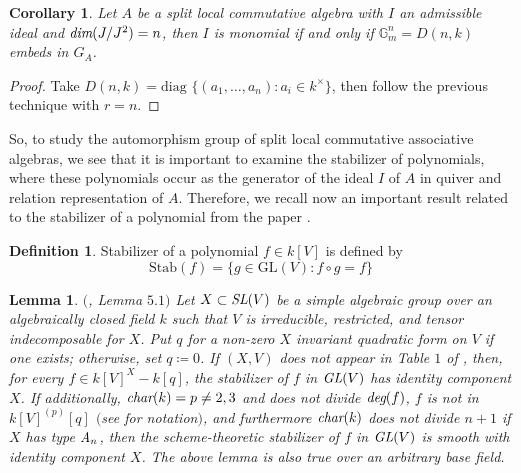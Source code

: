 \documentclass[12pt]{amsart}
\newtheorem{lemma}[theorem]{Lemma}
\newtheorem{corollary}[theorem]{Corollary}
\theoremstyle{definition}
\newtheorem{definition}[theorem]{Definition}
\numberwithin{equation}{section}
\begin{document}
\begin{corollary}\label{Corollary 5.27}
Let $A$ be a split local commutative algebra with $I$ an admissible ideal and $\emph{dim}(J/J^2)=n$, then $I$ is monomial if and only if $\mathbb{G}_m^n=D(n,k)$ embeds in $G_A$. 
\end{corollary} 
\vskip1mm
\begin{proof}
    Take $D(n,k)=\text{diag }\{(a_1,\dots,a_n): a_i\in k^{\times}\}$, then follow the previous technique with $r=n$.
\end{proof}
\vspace{0.1in}
\noindent
So, to study the automorphism group of split local commutative associative algebras, we see that it is important to examine the stabilizer of polynomials, where these polynomials occur as the generator of the ideal $I$ of $A$ in quiver and relation representation of $A$. Therefore, we recall now an important result related to the stabilizer of a polynomial from the paper \cite{GG}.

\vspace{0.2in}

\begin{definition}\label{Definition 5.28} 
Stabilizer of a polynomial $f\in k[V]$ is defined by
\begin{equation*}\label{eq28}
\text{Stab}(f)=\{g\in \text{GL}(V): f\circ g=f\}
\end{equation*}
\end{definition}

\vskip2mm

\begin{lemma}\label{Lemma 5.29}
$($\cite{GG}, \emph{Lemma} $5.1)$ Let $X\subset \emph{SL}(V)$ be a simple algebraic group over an algebraically closed field $k$ such that $V$ is irreducible, restricted, and tensor indecomposable for $X$. Put $q$ for a non-zero $X$ invariant quadratic form on $V$ if one exists; otherwise, set $q\coloneq0$. If $(X,V)$ does not appear in Table $1$ of \cite{Sei}, then, for every $f\in k[V]^X-k[q]$, the stabilizer of $f$ in $\emph{\text{GL}}(V)$ has identity component $X$.
If additionally, $\emph{char}(k)=p\neq 2,3$ and does not divide $\emph{\text{deg}}(f)$,  $f$ is not in $k[V]^{(p)}[q]$ $($see \cite{GG} for notation$)$, and furthermore $\emph{char}(k)$ does not divide $n+1$ if $X$ has type $\emph{A}_n$, then the scheme-theoretic stabilizer of $f$ in $\emph{\text{GL}}(V)$ is smooth with identity component $X$. The above lemma is also true over an arbitrary base field.
\end{lemma}
\end{document}
